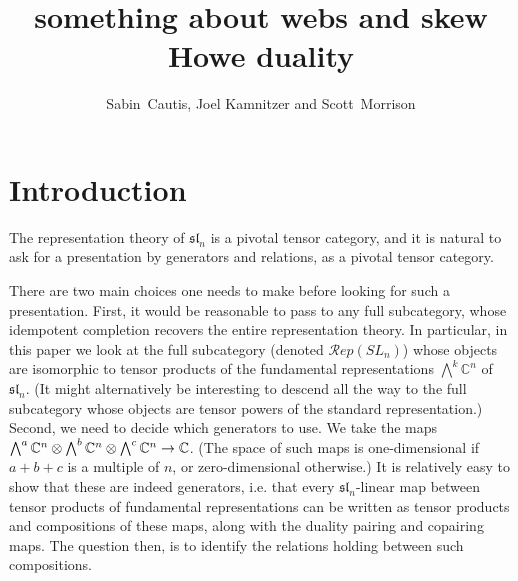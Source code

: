 \documentclass[11pt,leqno]{article}
\title{something about webs and skew Howe duality}
\author{Sabin~Cautis, Joel Kamnitzer and Scott~Morrison}
\begin{document}
\makeatletter
{}
\gdef\theequation{\thesection.\arabic{equation}}
\makeatother

\maketitle

\begin{abstract}
\end{abstract}


\tableofcontents


\newcommand{\alt}{\wedge}

\newcommand{\Alt}{\bigwedge}

\renewcommand{\sl}[1]{\mathfrak{sl}_{#1}}
\newcommand{\Usl}[1]{U\sl{#1}}

\newcommand{\one}{1}

\newcommand{\gl}[1]{\mathfrak{gl}_{#1}}
\newcommand{\Ugl}[1]{U\gl{#1}}

\newcommand{\ul}[1]{{\underline{#1}}}

\newcommand{\RepSL}[1]{\mathcal{R}ep(SL_{#1})}
\newcommand{\Lad}{\mathcal{L}ad}

\section{Introduction}
The representation theory of $\sl{n}$ is a pivotal tensor category, and it is natural to ask for a presentation by generators and relations, as a pivotal tensor category.

There are two main choices one needs to make before looking for such a presentation. First, it would be reasonable to pass to any full subcategory, whose idempotent completion recovers the entire representation theory. In particular, in this paper we look at the full subcategory (denoted $\RepSL{n}$) whose objects are isomorphic to tensor products of the fundamental representations $\Alt^k \mathbb C^n$ of $\sl{n}$. (It might alternatively be interesting to descend all the way to the full subcategory whose objects are tensor powers of the standard representation.) Second, we need to decide which generators to use. We take the maps $\Alt^a \mathbb{C}^n \tensor \Alt^b \mathbb{C}^n \tensor \Alt^c \mathbb{C}^n \to \mathbb{C}$. (The space of such maps is one-dimensional if $a+b+c$ is a multiple of $n$, or zero-dimensional otherwise.) It is relatively easy to show that these are indeed generators, i.e. that every $\sl{n}$-linear map between tensor products of fundamental representations can be written as tensor products and compositions of these maps, along with the duality pairing and copairing maps. The question then, is to identify the relations holding between such compositions.
\end{document}
